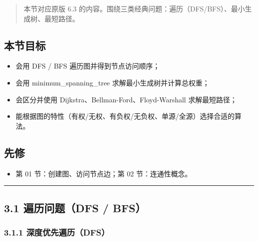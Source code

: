 \begin{quote}
本节对应原版 6.3
的内容。围绕三类经典问题：遍历（DFS/BFS）、最小生成树、最短路径。
\end{quote}

\subsection{本节目标}\label{ux672cux8282ux76eeux6807-25}

\begin{itemize}
\tightlist
\item
  会用 DFS / BFS 遍历图并得到节点访问顺序；
\item
  会用 minimum\_spanning\_tree 求解最小生成树并计算总权重；
\item
  会区分并使用 Dijkstra、Bellman-Ford、Floyd-Warshall 求解最短路径；
\item
  能根据图的特性（有权/无权、有负权/无负权、单源/全源）选择合适的算法。
\end{itemize}

\subsection{先修}\label{ux5148ux4fee-18}

\begin{itemize}
\tightlist
\item
  第 01 节：创建图、访问节点边；第 02 节：连通性概念。
\end{itemize}

\begin{center}\rule{0.5\linewidth}{0.5pt}\end{center}

\subsection{3.1 遍历问题（DFS /
BFS）}\label{ux904dux5386ux95eeux9898dfs-bfs}

\subsubsection{3.1.1
深度优先遍历（DFS）}\label{ux6df1ux5ea6ux4f18ux5148ux904dux5386dfs}

